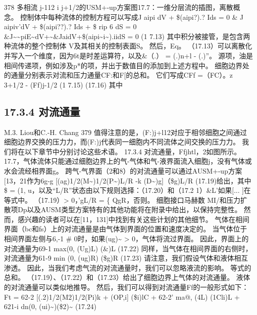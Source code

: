 \documentclass[UTF8,11pt,a4paper,openany,fontset=fandol]{ctexbook}
\begin{document}
378 多相流 j-112 i j+1/2的USM+-up方案图17.7：一维分层流的插图，离散概念。 控制体中每种流体的控制方程可以写成J aipi dV + \$(aipi?).? Ids = 0 \& J aipiv'dV + \$(aipi??).? Ids + \$ rip 6 dS = 0 \&J\textasciitilde{}\textasciitilde{}piE\textasciitilde{}dV+\textasciitilde{}\&JaidV+\$(aipi\textasciitilde{}i\textasciitilde{}).iidS = 0 (1 7.13) 其中积分被接管，是包含两种流体的整个控制体 V及其相关的控制表面S。 然后，Eq。 （17.13）可以离散化并写入一个维度，因为6t是时差运算符，以及\&（.） = (.)n+l - (.)”。 源项，油是相间传递项，例如涉及p*的项，并出于数值目的添加到上述方程中。 细胞边界处的通量分别表示对流和压力通量CF:和F[的总和。 它们写成CFf =（FC）。z 3+1/2 - (Ff)j-1/2 (1 7.15) (17.16) 其中

\subsection{17.3.4 对流通量}
M.3. Liou和C.-H. Chang 379 值得注意的是，(F:)j+l12对应于相邻细胞之间通过细胞边界交换的压力力，而(F:)j代表同一细胞内不同流体之间交换的压力力。 我们将在以下章节中分别讨论这些术语。 17.3.4 对流通量，Ffjhtl，2如图所示。 17.7，气体流体只能通过细胞边界上的气-气体和气-液界面流入细胞j，没有气体或水会流经相界面g。 跨气-气界面（2和8）的对流通量可以通过AUSM+-up方案[13，21作为6g-g [(ag)1/2(M\textasciitilde{})1/2(P\textasciitilde{})L/R -k (D\textasciitilde{})g]（\$g)L/R (17.19)给出，其中\$ = (1, u，以及“L/R”状态由以下规则选择：（17.20）和（17.2 1）\&L'如果[... ]在等式中。 （17.19）> 0，'gL/R = \{ QgR，否则。 细胞接口马赫数 MI/和压力扩散项Dp以及AUSM类型方案特有的其他功能将在附录中给出，以保持完整性。 然而，感兴趣的读者可以在[11，131]中找到有关这些计划的其他细节。 气体在相间界面（bc和fs）上的对流通量是由气体到界面的位置和速度决定的。 当气体位于相间界面左侧与6,-1 \# 0时，如果(ug)\textasciitilde{} > 0，气体将流过界面。 因此，界面上的对流通量为69-1 max(0, (Ug)L) (\&)L (17.22) 同样，当气体在相间界面的右侧时，对流通量为61-9 min (0, (ug)R) (\$g)R (17.23) 请注意，我们假设气体和液体相互渗透。 因此，当我们考虑气流的对流通量时，我们可以忽略液流的影响。 等式的总和。 （17.19）、（17.22）和（17.23）给出了细胞边界上气体的对流通量。 液体的对流通量可以类似地推导。 然后，我们可以得到对流通量Ff的一般形式如下：Ft = 62-2 [(.2)1/2(M2)1/2(Pi)k + (OP,i] (\$i)lC + 62-2' ma@, (4L) (1Cli)L + 621-i dn(0, (ui)\textasciitilde{})(\$2)\textasciitilde{} (17.24)
\end{document}
